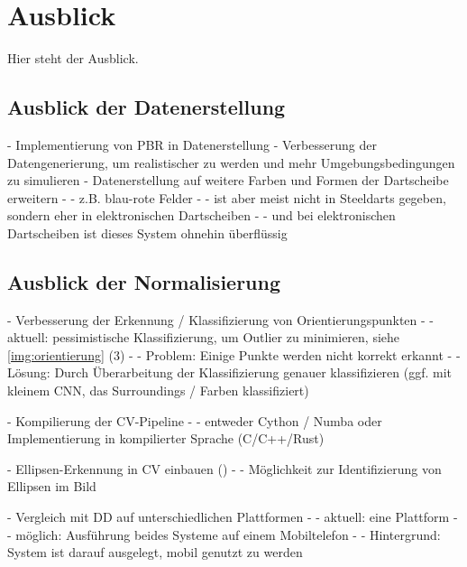 
\chapter{Ausblick}
\label{cha:ausblick}

Hier steht der Ausblick.


\section{Ausblick der Datenerstellung}
\label{sec:ausblick_data}

- Implementierung von PBR in Datenerstellung
- Verbesserung der Datengenerierung, um realistischer zu werden und mehr Umgebungsbedingungen zu simulieren
- Datenerstellung auf weitere Farben und Formen der Dartscheibe erweitern
- - z.B. blau-rote Felder
- - ist aber meist nicht in Steeldarts gegeben, sondern eher in elektronischen Dartscheiben
- - und bei elektronischen Dartscheiben ist dieses System ohnehin überflüssig



\section{Ausblick der Normalisierung}
\label{sec:ausblick_cv}

- Verbesserung der Erkennung / Klassifizierung von Orientierungspunkten
- - aktuell: pessimistische Klassifizierung, um Outlier zu minimieren, siehe \autoref{img:orientierung} (3)
- - Problem: Einige Punkte werden nicht korrekt erkannt
- - Lösung: Durch Überarbeitung der Klassifizierung genauer klassifizieren (ggf. mit kleinem CNN, das Surroundings / Farben klassifiziert)

- Kompilierung der CV-Pipeline
- - entweder Cython \cite{cython} / Numba \cite{numba} oder Implementierung in kompilierter Sprache (C/C++/Rust)

- Ellipsen-Erkennung in CV einbauen (\cite{ellipse_detection_algorithm})
- - Möglichkeit zur Identifizierung von Ellipsen im Bild

- Vergleich mit DD auf unterschiedlichen Plattformen
- - aktuell: eine Plattform
- - möglich: Ausführung beides Systeme auf einem Mobiltelefon
- - Hintergrund: System ist darauf ausgelegt, mobil genutzt zu werden

